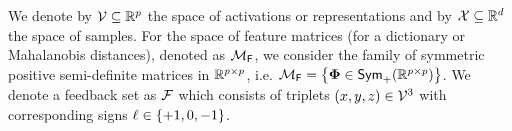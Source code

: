 \begin{figure*}[t!]
    
    \label{fig: monoconst} %
\end{figure*}


We denote by ${\mathcal{V}} \subseteq \mathbb{R}^p$ the space of activations or representations and by ${\mathcal{X}} \subseteq \mathbb{R}^d$ the space of samples. For the space of feature matrices (for a dictionary or Mahalanobis distances), denoted as ${\mathcal{M}}_{\mathsf{F}}$, we consider the family of symmetric positive semi-definite matrices in $\mathbb{R}^{p \times p}$, i.e. $ {\mathcal{M}}_{\mathsf{F}} = \left\{\boldsymbol{\Phi} \in \textsf{Sym}_{+}(\mathbb{R}^{p\times p})\right\}$. We denote a feedback set as ${\mathcal{F}}$ which consists of triplets $(x,y,z) \in {\mathcal{V}}^3$ with corresponding signs $\ell \in \left\{+1,0,-1\right\}$.


